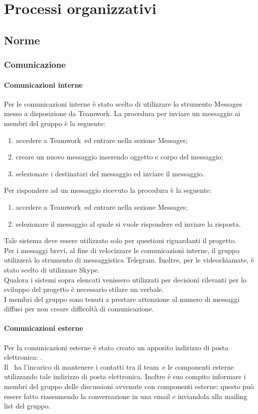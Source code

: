 \documentclass[../NormeProgetto.tex]{subfiles}
\begin{document}
\section{Processi organizzativi}
	\subsection{Norme}
		\subsubsection{Comunicazione}
			\paragraph{Comunicazioni interne}
			Per le comunicazioni interne è stato scelto di utilizzare lo strumento Messages messo a disposizione da Teamwork\g.
			La procedura per inviare un messaggio ai membri del gruppo è la seguente:
			\begin{enumerate}
				\item accedere a Teamwork\g\ ed entrare nella sezione Messages;
				\item creare un nuovo messaggio inserendo oggetto e corpo del messaggio;
				\item selezionare i destinatari del messaggio ed inviare il messaggio.
			\end{enumerate}
			Per rispondere ad un messaggio ricevuto la procedura è la seguente:
			\begin{enumerate}
				\item accedere a Teamwork\g\ ed entrare nella sezione Messages;
				\item selezionare il messaggio al quale si vuole rispondere ed inviare la risposta.
			\end{enumerate}
			 Tale sistema deve essere utilizzato solo per questioni riguardanti il progetto. \\
			Per i messaggi brevi, al fine di velocizzare le comunicazioni interne, il gruppo utilizzerà lo strumento di messaggistica Telegram\g. Inoltre, per le videochiamate, è stato scelto di utilizzare Skype\g. \\
			Qualora i sistemi sopra elencati venissero utilizzati per decisioni rilevanti per lo sviluppo del progetto è necessario stilare un verbale.\\
			I membri del gruppo sono tenuti a prestare attenzione al numero di messaggi diffusi per non creare difficoltà di comunicazione. 
			\paragraph{Comunicazioni esterne}
			Per la comunicazioni esterne è stato creato un apposito indirizzo di posta elettronica: \mailleaf. \\
			Il \responsabilediprogetto\ ha l'incarico di mantenere i contatti tra il team\g\ e le componenti esterne utilizzando tale indirizzo di posta elettronica. Inoltre è suo compito informare i membri del gruppo delle discussioni avvenute con componenti esterne: questo può essere fatto riassumendo la conversazione in una email e inviandola alla mailing list del gruppo.
\end{document}
